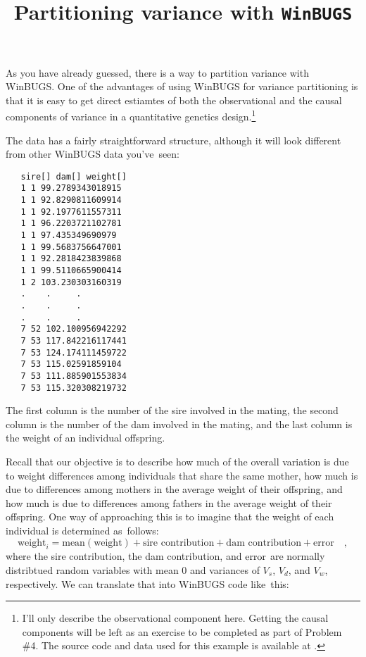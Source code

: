 \documentclass[12pt]{article}
\title{Partitioning variance with {\tt WinBUGS}}
\begin{document}
\maketitle

\thispagestyle{first}

As you have already guessed, there is a way to partition variance with
WinBUGS. One of the advantages of using WinBUGS for variance
partitioning is that it is easy to get direct estiamtes of both the
observational and the causal components of variance in a quantitative
genetics design.\footnote{I'll only describe the observational
  component here. Getting the causal components will be left as an
  exercise to be completed as part of Problem \#4. The source code and
  data used for this example is available at
  .}

The data has a fairly straightforward structure, although it will look
different from other WinBUGS data you've~seen:

\begin{verbatim}
   sire[] dam[] weight[]
   1 1 99.2789343018915
   1 1 92.8290811609914
   1 1 92.1977611557311
   1 1 96.2203721102781
   1 1 97.435349690979
   1 1 99.5683756647001
   1 1 92.2818423839868
   1 1 99.5110665900414
   1 2 103.230303160319
   .    .     .
   .    .     .
   .    .     .
   7 52 102.100956942292
   7 53 117.842216117441
   7 53 124.174111459722
   7 53 115.02591859104
   7 53 111.885901553834
   7 53 115.320308219732
\end{verbatim}

The first column is the number of the sire involved in the mating, the
second column is the number of the dam involved in the mating, and the
last column is the weight of an individual offspring.

Recall that our objective is to describe how much of the overall
variation is due to weight differences among individuals that share
the same mother, how much is due to differences among mothers in the
average weight of their offspring, and how much is due to differences
among fathers in the average weight of their offspring. One way of
approaching this is to imagine that the weight of each individual is
determined as~follows:
\[
\mbox{weight}_i = \mbox{mean}(\mbox{weight})
                  + \mbox{sire contribution}
                  + \mbox{dam contribution}
                  + \mbox{error} \quad ,
\]
where the sire contribution, the dam contribution, and $\hbox{error}$
are normally distribtued random variables with mean $0$ and variances
of $V_s$, $V_d$, and $V_w$, respectively. We can translate that into
WinBUGS code like~this:
\end{document}
